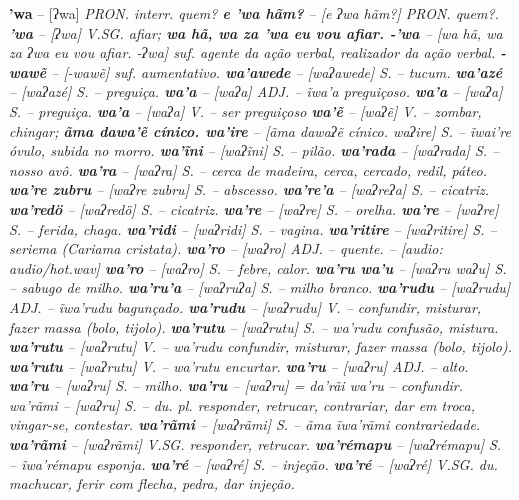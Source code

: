 \textbf{'wa} -- [ʔwa] \textit{PRON. interr. quem?
\textbf{e 'wa hãm?} -- [e ʔwa hãm?] \textit{PRON. quem?.
\textbf{'wa} -- [ʔwa] \textit{V.}SG. afiar;
\textbf{wa hã, wa za 'wa eu vou afiar. -'wa} -- [wa hã, wa za ʔwa eu vou afiar. -ʔwa] \textit{suf. agente da ação verbal, realizador da ação verbal.
\textbf{-wawẽ} -- [-wawẽ] \textit{suf. aumentativo.
\textbf{wa'awede} -- [waʔawede] \textit{S.} -- tucum.
\textbf{wa'azé} -- [waʔazé] \textit{S.} -- preguiça.
\textbf{wa'a} -- [waʔa] \textit{ADJ.} -- ĩwa'a preguiçoso.
\textbf{wa'a} -- [waʔa] \textit{S.} -- preguiça.
\textbf{wa'a} -- [waʔa] \textit{V.} -- {ser preguiçoso}
\textbf{wa'ẽ} -- [waʔẽ] \textit{V.} -- zombar, chingar;
\textbf{ãma dawa'ẽ cínico. wa'ire} -- [ãma dawaʔẽ cínico. waʔire] \textit{S.} -- ĩwai're óvulo, subida no morro.
\textbf{wa'ĩni} -- [waʔĩni] \textit{S.} -- pilão.
\textbf{wa'rada} -- [waʔrada] \textit{S.} -- nosso avô.
\textbf{wa'ra} -- [waʔra] \textit{S.} -- cerca de madeira, cerca, cercado, redil, páteo.
\textbf{wa're zubru} -- [waʔre zubru] \textit{S.} -- abscesso.
\textbf{wa're'a} -- [waʔreʔa] \textit{S.} -- cicatriz.
\textbf{wa'redö} -- [waʔredö] \textit{S.} -- cicatriz.
\textbf{wa're} -- [waʔre] \textit{S.} -- orelha.
\textbf{wa're} -- [waʔre] \textit{S.} -- ferida, chaga.
\textbf{wa'ridi} -- [waʔridi] \textit{S.} -- vagina.
\textbf{wa'ritire} -- [waʔritire] \textit{S.} -- seriema (Cariama cristata).
\textbf{wa'ro} -- [waʔro] \textit{ADJ.} -- quente.} -- [audio: audio/hot.wav]
\textbf{wa'ro} -- [waʔro] \textit{S.} -- febre, calor.
\textbf{wa'ru wa'u} -- [waʔru waʔu] \textit{S.} -- sabugo de milho.
\textbf{wa'ru'a} -- [waʔruʔa] \textit{S.} -- milho branco.
\textbf{wa'rudu} -- [waʔrudu] \textit{ADJ.} -- ĩwa'rudu bagunçado.
\textbf{wa'rudu} -- [waʔrudu] \textit{V.} -- confundir, misturar, fazer massa (bolo, tijolo).
\textbf{wa'rutu} -- [waʔrutu] \textit{S.} -- wa'rudu confusão, mistura.
\textbf{wa'rutu} -- [waʔrutu] \textit{V.} -- wa'rudu confundir, misturar, fazer massa (bolo, tijolo).
\textbf{wa'rutu} -- [waʔrutu] \textit{V.} -- wa'rutu encurtar.
\textbf{wa'ru} -- [waʔru] \textit{ADJ.} -- alto.
\textbf{wa'ru} -- [waʔru] \textit{S.} -- milho.
\textbf{wa'ru} -- [waʔru] \textit{= da'rãi wa'ru -- confundir. wa'rãmi} -- [waʔru] \textit{S.} -- du. pl. responder, retrucar, contrariar, dar em troca, vingar-se, contestar.
\textbf{wa'rãmi} -- [waʔrãmi] \textit{S.} -- ãma ĩwa'rãmi contrariedade.
\textbf{wa'rãmi} -- [waʔrãmi] \textit{V.}SG. responder, retrucar.
\textbf{wa'rémapu} -- [waʔrémapu] \textit{S.} -- ĩwa'rémapu esponja.
\textbf{wa'ré} -- [waʔré] \textit{S.} -- injeção.
\textbf{wa'ré} -- [waʔré] \textit{V.}SG. du. machucar, ferir com flecha, pedra, dar injeção.
}}}

